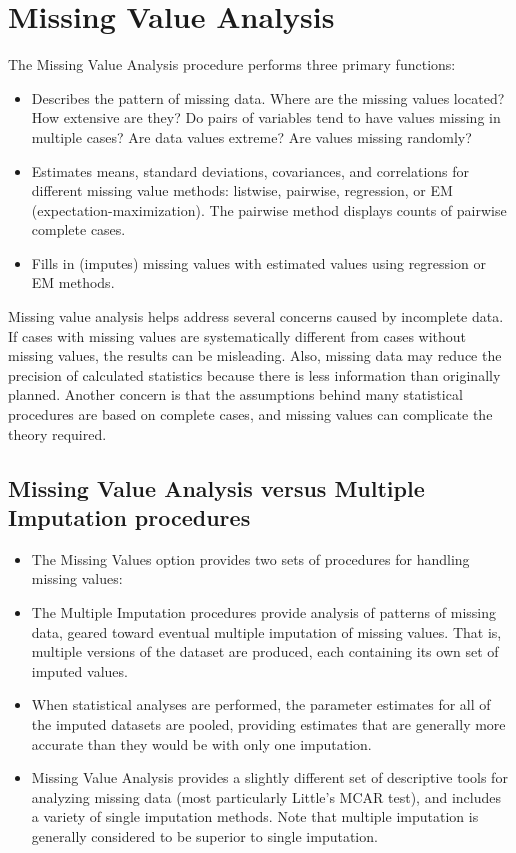 \documentclass[a4paper,12pt]{article}
\begin{document}
\section{Missing Value Analysis}
%
The Missing Value Analysis procedure performs three primary functions:

\begin{itemize}
\item Describes the pattern of missing data. Where are the missing values located? How extensive
are they? Do pairs of variables tend to have values missing in multiple cases? Are data
values extreme? Are values missing randomly?
\item Estimates means, standard deviations, covariances, and correlations for different missing
value methods: listwise, pairwise, regression, or EM (expectation-maximization). The
pairwise method displays counts of pairwise complete cases.
\item Fills in (imputes) missing values with estimated values using regression or EM methods.
\end{itemize}

Missing value analysis helps address several concerns caused by incomplete data. If cases with
missing values are systematically different from cases without missing values, the results can be
misleading. Also, missing data may reduce the precision of calculated statistics because there
is less information than originally planned. Another concern is that the assumptions behind
many statistical procedures are based on complete cases, and missing values can complicate
the theory required.



\subsection{Missing Value Analysis versus Multiple Imputation procedures}
\begin{itemize}
	\item The Missing Values option provides two sets of procedures for handling missing values:
\item The Multiple Imputation procedures provide analysis of patterns of missing data, geared toward eventual multiple imputation of missing values. That is, multiple versions of the dataset are produced, each containing its own set of imputed values. \item When statistical analyses are performed, the parameter estimates for all of the imputed datasets are pooled, providing estimates that are generally more accurate than they would be with only one imputation.
	\item
	Missing Value Analysis provides a slightly different set of descriptive tools for analyzing missing data (most particularly Little's MCAR test), and includes a variety of single imputation methods. Note that multiple imputation is generally considered to be superior to single imputation.
\end{itemize}
\end{document}
